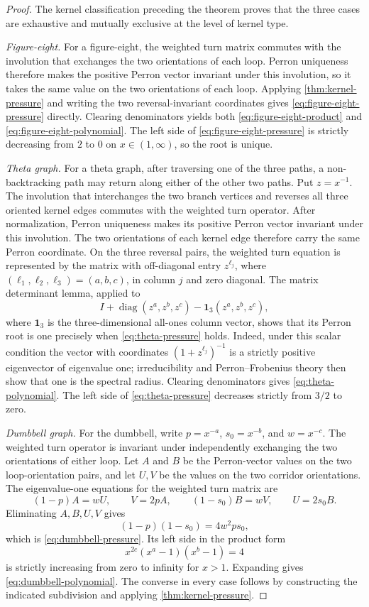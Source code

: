 \documentclass[10pt,a4paper]{amsart}
\begin{document}
\begin{proof}
The kernel classification preceding the theorem proves that the three cases
are exhaustive and mutually exclusive at the level of kernel type.

\emph{Figure-eight.}  For a figure-eight, the weighted turn
matrix commutes with the involution that exchanges the two orientations of
each loop.  Perron uniqueness therefore makes the positive Perron vector
invariant under this involution, so it takes the same
value on the two orientations of each loop.  Applying
\cref{thm:kernel-pressure} and writing the two reversal-invariant coordinates
gives \eqref{eq:figure-eight-pressure} directly.
Clearing denominators yields both \eqref{eq:figure-eight-product} and
\eqref{eq:figure-eight-polynomial}.  The left side of
\eqref{eq:figure-eight-pressure} is strictly decreasing from \(2\) to \(0\)
on \(x\in(1,\infty)\), so the root is unique.

\emph{Theta graph.}  For a theta graph, after traversing one of the three
paths, a non-backtracking path may return along either of the other two paths.
Put \(z=x^{-1}\).  The involution that interchanges the two branch vertices
and reverses all three oriented kernel edges commutes with the weighted turn
operator.  After normalization, Perron uniqueness makes its positive Perron
vector invariant under this involution.  The two orientations of each kernel
edge therefore carry the same Perron coordinate.  On the three reversal
pairs, the weighted turn equation is represented by the matrix with
off-diagonal entry \(z^{\ell_j}\), where
\((\ell_1,\ell_2,\ell_3)=(a,b,c)\), in column \(j\) and zero
diagonal.  The matrix determinant lemma, applied to
\[
  I+\operatorname{diag}(z^a,z^b,z^c)
  -\mathbf1_3(z^a,z^b,z^c),
\]
where \(\mathbf1_3\) is the three-dimensional all-ones column vector, shows
that its Perron root is one precisely when
\eqref{eq:theta-pressure} holds.  Indeed, under this scalar condition
the vector with coordinates \((1+z^{\ell_j})^{-1}\) is a strictly positive
eigenvector of eigenvalue one; irreducibility and Perron--Frobenius theory
then show that one is the spectral radius.  Clearing denominators gives
\eqref{eq:theta-polynomial}.  The left side of
\eqref{eq:theta-pressure} decreases strictly from \(3/2\) to zero.

\emph{Dumbbell graph.}  For the dumbbell, write
\(p=x^{-a}\), \(s_0=x^{-b}\), and \(w=x^{-c}\).
The weighted turn operator is invariant under independently exchanging
the two orientations of either loop.  Let \(A\) and \(B\) be the
Perron-vector values on the two loop-orientation pairs, and let \(U,V\) be the
values on the two corridor orientations.  The eigenvalue-one equations for
the weighted turn matrix are
\[
  (1-p)A=wU,\qquad V=2pA,\qquad
  (1-s_0)B=wV,\qquad U=2s_0B.
\]
Eliminating \(A,B,U,V\) gives
\[
  (1-p)(1-s_0)=4w^2ps_0,
\]
which is \eqref{eq:dumbbell-pressure}.  Its left side in the product form
\[
  x^{2c}(x^a-1)(x^b-1)=4
\]
is strictly increasing from zero to infinity for \(x>1\).  Expanding gives
\eqref{eq:dumbbell-polynomial}.  The converse in every case follows by
constructing the indicated subdivision and applying
\cref{thm:kernel-pressure}.
\end{proof}
\end{document}
